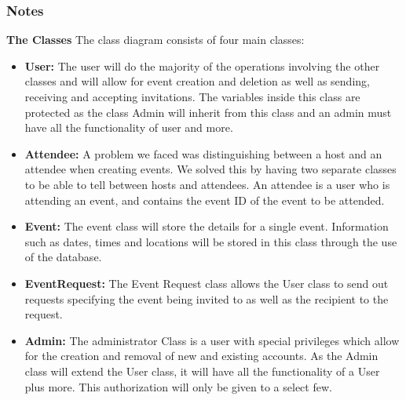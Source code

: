 \documentclass[a4paper]{article}
\begin{document}
\subsubsection{Notes}
\textbf{The Classes}
The class diagram consists of four main classes:
\begin{itemize}
    \item \textbf{User:} The user will do the majority of the operations involving the other classes and will allow for event creation and deletion as well as sending, receiving and accepting invitations. The variables inside this class are protected as the class Admin will inherit from this class and an admin must have all the functionality of user and more.
    \item \textbf{Attendee:} A problem we faced was distinguishing between a host and an attendee when creating events. We solved this by having two separate classes to be able to tell between hosts and attendees. An attendee is a user who is attending an event, and contains the event ID of the event to be attended.
    \item \textbf{Event:} The event class will store the details for a single event. Information such as dates, times and locations will be stored in this class through the use of the database.
    \item \textbf{EventRequest:} The Event Request class allows the User class to send out requests specifying the event being invited to as well as the recipient to the request.
    \item \textbf{Admin:} The administrator Class is a user with special privileges which allow for the creation and removal of new and existing accounts. As the Admin class will extend the User class, it will have all the functionality of a User plus more. This authorization will only be given to a select few.
\end{itemize}
\end{document}
